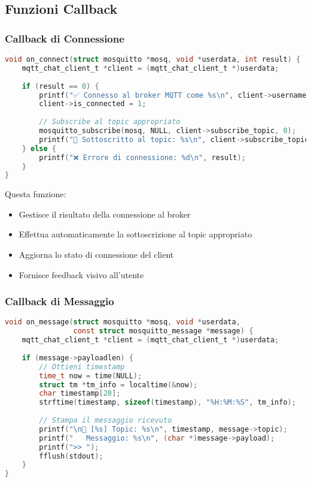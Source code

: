 \documentclass[12pt,a4paper]{article}
\begin{document}
\subsection{Funzioni Callback}

\subsubsection{Callback di Connessione}
\begin{lstlisting}[language=c, caption=Gestione Connessione]
void on_connect(struct mosquitto *mosq, void *userdata, int result) {
    mqtt_chat_client_t *client = (mqtt_chat_client_t *)userdata;
    
    if (result == 0) {
        printf("✅ Connesso al broker MQTT come %s\n", client->username);
        client->is_connected = 1;
        
        // Subscribe al topic appropriato
        mosquitto_subscribe(mosq, NULL, client->subscribe_topic, 0);
        printf("📡 Sottoscritto al topic: %s\n", client->subscribe_topic);
    } else {
        printf("❌ Errore di connessione: %d\n", result);
    }
}
\end{lstlisting}

Questa funzione:
\begin{itemize}
    \item Gestisce il risultato della connessione al broker
    \item Effettua automaticamente la sottoscrizione al topic appropriato
    \item Aggiorna lo stato di connessione del client
    \item Fornisce feedback visivo all'utente
\end{itemize}

\subsubsection{Callback di Messaggio}
\begin{lstlisting}[language=c, caption=Ricezione Messaggi]
void on_message(struct mosquitto *mosq, void *userdata, 
                const struct mosquitto_message *message) {
    mqtt_chat_client_t *client = (mqtt_chat_client_t *)userdata;
    
    if (message->payloadlen) {
        // Ottieni timestamp
        time_t now = time(NULL);
        struct tm *tm_info = localtime(&now);
        char timestamp[20];
        strftime(timestamp, sizeof(timestamp), "%H:%M:%S", tm_info);
        
        // Stampa il messaggio ricevuto
        printf("\n💬 [%s] Topic: %s\n", timestamp, message->topic);
        printf("   Messaggio: %s\n", (char *)message->payload);
        printf(">> ");
        fflush(stdout);
    }
}
\end{lstlisting}
\end{document}
